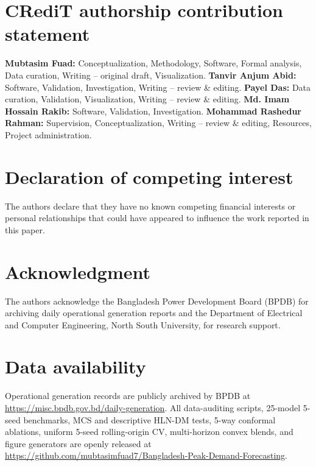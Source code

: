 \documentclass[5p,twocolumn,authoryear]{elsarticle}
\begin{document}
\FloatBarrier

\section*{CRediT authorship contribution statement}
\textbf{Mubtasim Fuad:} Conceptualization, Methodology, Software, Formal analysis, Data curation, Writing -- original draft, Visualization. \textbf{Tanvir Anjum Abid:} Software, Validation, Investigation, Writing -- review \& editing. \textbf{Payel Das:} Data curation, Validation, Visualization, Writing -- review \& editing. \textbf{Md. Imam Hossain Rakib:} Software, Validation, Investigation. \textbf{Mohammad Rashedur Rahman:} Supervision, Conceptualization, Writing -- review \& editing, Resources, Project administration.

\section*{Declaration of competing interest}
The authors declare that they have no known competing financial interests or personal relationships that could have appeared to influence the work reported in this paper.

\section*{Acknowledgment}
The authors acknowledge the Bangladesh Power Development Board (BPDB) for archiving daily operational generation reports and the Department of Electrical and Computer Engineering, North South University, for research support.

\section*{Data availability}
Operational generation records are publicly archived by BPDB at \url{https://misc.bpdb.gov.bd/daily-generation}. All data-auditing scripts, 25-model 5-seed benchmarks, MCS and descriptive HLN-DM tests, 5-way conformal ablations, uniform 5-seed rolling-origin CV, multi-horizon convex blends, and figure generators are openly released at \url{https://github.com/mubtasimfuad7/Bangladesh-Peak-Demand-Forecasting}.



\end{document}
